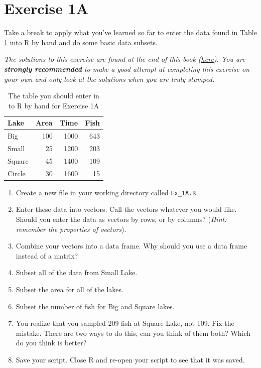 \documentclass[]{book}
\providecommand{\tightlist}{%
  \setlength{\itemsep}{0pt}\setlength{\parskip}{0pt}}
\theoremstyle{definition}
\theoremstyle{definition}
\theoremstyle{definition}
\theoremstyle{remark}
\begin{document}
\section*{Exercise 1A}\label{exercise-1a}

Take a break to apply what you've learned so far to enter the data found
in Table \ref{tab:ex-1-table-pdf} into R by hand and do some basic data
subsets.

\emph{The solutions to this exercise are found at the end of this book
(\protect\hyperlink{ex1a-answers}{here}). You are \textbf{strongly
recommended} to make a good attempt at completing this exercise on your
own and only look at the solutions when you are truly stumped.}

\begin{table}

\caption{\label{tab:ex-1-table-pdf}The table you should enter in to R by hand for Exercise 1A}
\centering
\begin{tabular}[t]{l|r|r|r}
\hline
Lake & Area & Time & Fish\\
\hline
Big & 100 & 1000 & 643\\
\hline
Small & 25 & 1200 & 203\\
\hline
Square & 45 & 1400 & 109\\
\hline
Circle & 30 & 1600 & 15\\
\hline
\end{tabular}
\end{table}

\begin{enumerate}
\def\labelenumi{\arabic{enumi}.}
\tightlist
\item
  Create a new file in your working directory called \texttt{Ex\_1A.R}.
\item
  Enter these data into vectors. Call the vectors whatever you would
  like. Should you enter the data as vectors by rows, or by columns?
  (\emph{Hint: remember the properties of vectors}).
\item
  Combine your vectors into a data frame. Why should you use a data
  frame instead of a matrix?
\item
  Subset all of the data from Small Lake.
\item
  Subset the area for all of the lakes.
\item
  Subset the number of fish for Big and Square lakes.
\item
  You realize that you sampled 209 fish at Square Lake, not 109. Fix the
  mistake. There are two ways to do this, can you think of them both?
  Which do you think is better?
\item
  Save your script. Close R and re-open your script to see that it was
  saved.
\end{enumerate}
\end{document}
